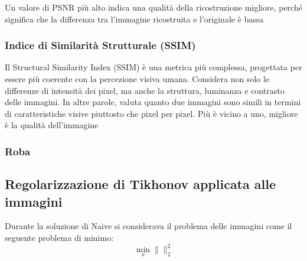 Un valore di PSNR più alto indica una qualità della ricostruzione migliore, perché significa che la differenza tra l'immagine ricostruita e l'originale è bassa

\subsubsection{Indice di Similarità Strutturale (SSIM)}
Il Structural Similarity Index (SSIM) è una metrica più complessa, progettata per essere più coerente con la percezione visiva umana. Considera non solo le differenze di intensità dei pixel, ma anche la struttura, luminanza e contrasto delle immagini. In altre parole, valuta quanto due immagini sono simili in termini di caratteristiche visive piuttosto che pixel per pixel. Più è vicino a uno, migliore è la qualità dell’immagine

\subsubsection{Roba}

\subsection{Regolarizzazione di Tikhonov applicata alle immagini}
Durante la soluzione di Naive si considerava il problema delle immagini come il seguente problema di minimo:
\[
    \min_x \|\|_2^2    
\]

